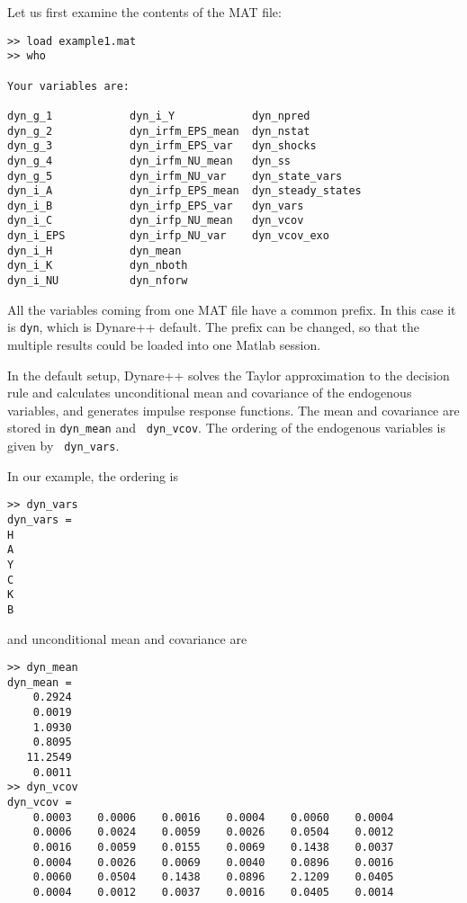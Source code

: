 \documentclass[10pt]{article}
\begin{document}
Let us first examine the contents of the MAT file:
{\small
\begin{verbatim}
>> load example1.mat
>> who

Your variables are:

dyn_g_1            dyn_i_Y            dyn_npred          
dyn_g_2            dyn_irfm_EPS_mean  dyn_nstat          
dyn_g_3            dyn_irfm_EPS_var   dyn_shocks         
dyn_g_4            dyn_irfm_NU_mean   dyn_ss             
dyn_g_5            dyn_irfm_NU_var    dyn_state_vars     
dyn_i_A            dyn_irfp_EPS_mean  dyn_steady_states  
dyn_i_B            dyn_irfp_EPS_var   dyn_vars           
dyn_i_C            dyn_irfp_NU_mean   dyn_vcov           
dyn_i_EPS          dyn_irfp_NU_var    dyn_vcov_exo       
dyn_i_H            dyn_mean           
dyn_i_K            dyn_nboth          
dyn_i_NU           dyn_nforw          
\end{verbatim}
}

All the variables coming from one MAT file have a common prefix. In
this case it is {\tt dyn}, which is Dynare++ default. The prefix can
be changed, so that the multiple results could be loaded into one Matlab
session.

In the default setup, Dynare++ solves the Taylor approximation to the
decision rule and calculates unconditional mean and covariance of the
endogenous variables, and generates impulse response functions. The
mean and covariance are stored in {\tt dyn\_mean} and {\tt
dyn\_vcov}. The ordering of the endogenous variables is given by {\tt
dyn\_vars}.

In our example, the ordering is

{\small
\begin{verbatim}
>> dyn_vars
dyn_vars =
H
A
Y
C
K
B
\end{verbatim}
}

and unconditional mean and covariance are

{\small
\begin{verbatim}
>> dyn_mean
dyn_mean =
    0.2924
    0.0019
    1.0930
    0.8095
   11.2549
    0.0011
>> dyn_vcov
dyn_vcov =
    0.0003    0.0006    0.0016    0.0004    0.0060    0.0004
    0.0006    0.0024    0.0059    0.0026    0.0504    0.0012
    0.0016    0.0059    0.0155    0.0069    0.1438    0.0037
    0.0004    0.0026    0.0069    0.0040    0.0896    0.0016
    0.0060    0.0504    0.1438    0.0896    2.1209    0.0405
    0.0004    0.0012    0.0037    0.0016    0.0405    0.0014
\end{verbatim}
}
\end{document}
